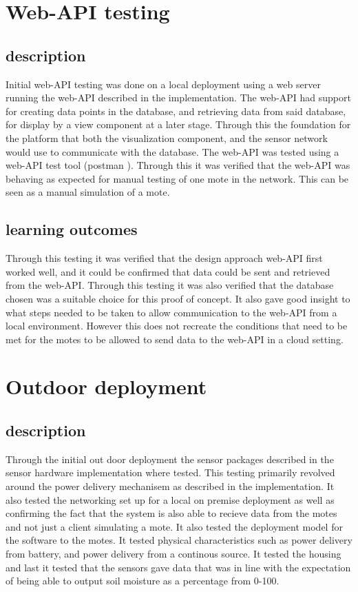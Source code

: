 \documentclass[]{uiophd}
\begin{document}
\section{Web-API testing}
\subsection{description}
Initial web-API testing was done on a local deployment using a web server running the web-API described in the implementation. The web-API had support for creating data points in the database, and retrieving data from said database, for display by a view component at a later stage. Through this the foundation for the platform that both the visualization component, and the sensor network would use to communicate with the database. The web-API was tested using a web-API test tool (postman \cite{postman}). Through this it was verified that the web-API was behaving as expected for manual testing of one mote in the network. This can be seen as a manual simulation of a mote.
\subsection{learning outcomes}
Through this testing it was verified that the design approach web-API first worked well, and it could be confirmed that data could be sent and retrieved from the web-API. Through this testing it was also verified that the database chosen was a suitable choice for this proof of concept. It also gave good insight to what steps needed to be taken to allow communication to the web-API from a local environment. However this does not recreate the conditions that need to be met for the motes to be allowed to send data to the web-API in a cloud setting.

\section{Outdoor deployment}
\subsection{description}
Through the initial out door deployment the sensor packages described in the sensor hardware implementation where tested. This testing primarily revolved around the power delivery mechanisem as described in the implementation. It also tested the networking set up for a local on premise deployment as well as confirming the fact that the system is also able to recieve data from the motes and not just a client simulating a mote. It also tested the deployment model for the software to the motes. It tested physical characteristics such as power delivery from battery, and power delivery from a continous source. It tested the housing  and last it tested that the sensors gave data that was in line with the expectation of being able to output soil moisture as a percentage from 0-100.
\end{document}
